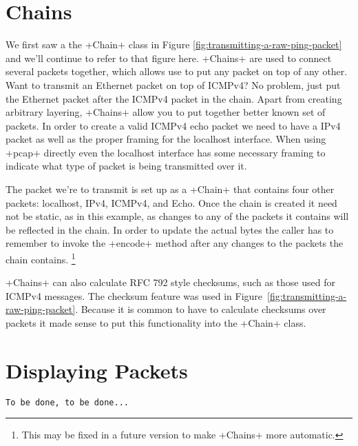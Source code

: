 \documentclass[11pt]{article}
\begin{document}
\section{Chains}
\label{sec:chains}

We first saw a the \class+Chain+ class in Figure
\ref{fig:transmitting-a-raw-ping-packet} and we'll continue to refer
to that figure here.  \class+Chains+ are used to connect several
packets together, which allows use to put any packet on top of any
other.  Want to transmit an Ethernet packet on top of ICMPv4?  No
problem, just put the Ethernet packet after the ICMPv4 packet in the
chain.  Apart from creating arbitrary layering, \class+Chains+ allow
you to put together better known set of packets.  In order to create a
valid ICMPv4 echo packet we need to have a IPv4 packet as well as the
proper framing for the localhost interface.  When using \program+pcap+
directly even the localhost interface has some necessary framing to
indicate what type of packet is being transmitted over it.  

The packet we're to transmit is set up as a \class+Chain+ that
contains four other packets: localhost, IPv4, ICMPv4, and Echo.  Once
the chain is created it need not be static, as in this example, as
changes to any of the packets it contains will be reflected in the
chain.  In order to update the actual bytes the caller has to remember
to invoke the \method+encode+ method after any changes to the packets
the chain contains.  \footnote{This may be fixed in a future version
  to make \class+Chains+ more automatic.}

\class+Chains+ can also calculate RFC 792 style checksums, such as
those used for ICMPv4 messages.  The checksum feature was used in
Figure~\ref{fig:transmitting-a-raw-ping-packet}.  Because it is common
to have to calculate checksums over packets it made sense to put this
functionality into the \class+Chain+ class.

\section{Displaying Packets}
\label{sec:displaying-packets}

\begin{Verbatim}
To be done, to be done...
\end{Verbatim}
\end{document}

